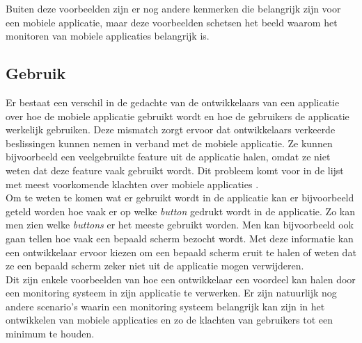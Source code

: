 Buiten deze voorbeelden zijn er nog andere kenmerken die belangrijk zijn voor een mobiele applicatie, maar deze voorbeelden schetsen het beeld waarom het monitoren van mobiele applicaties belangrijk is.

\subsection{Gebruik}
Er bestaat een verschil in de gedachte van de ontwikkelaars van een applicatie over hoe de mobiele applicatie gebruikt wordt en hoe de gebruikers de applicatie werkelijk gebruiken. Deze mismatch zorgt ervoor dat ontwikkelaars verkeerde beslissingen kunnen nemen in verband met de mobiele applicatie. Ze kunnen bijvoorbeeld een veelgebruikte feature uit de applicatie halen, omdat ze niet weten dat deze feature vaak gebruikt wordt. Dit probleem komt voor in de lijst met meest voorkomende klachten over mobiele applicaties \cite{AppSucks}. \\

Om te weten te komen wat er gebruikt wordt in de applicatie kan er bijvoorbeeld geteld worden hoe vaak er op welke \textit{button} gedrukt wordt in de applicatie. Zo kan men zien welke \textit{buttons} er het meeste gebruikt worden. Men kan bijvoorbeeld ook gaan tellen hoe vaak een bepaald scherm bezocht wordt. Met deze informatie kan een ontwikkelaar ervoor kiezen om een bepaald scherm eruit te halen of weten dat ze een bepaald scherm zeker niet uit de applicatie mogen verwijderen. \\


Dit zijn enkele voorbeelden van hoe een ontwikkelaar een voordeel kan halen door een monitoring systeem in zijn applicatie te verwerken. Er zijn natuurlijk nog andere scenario's waarin een monitoring systeem belangrijk kan zijn in het ontwikkelen van mobiele applicaties en zo de klachten van gebruikers tot een minimum te houden.